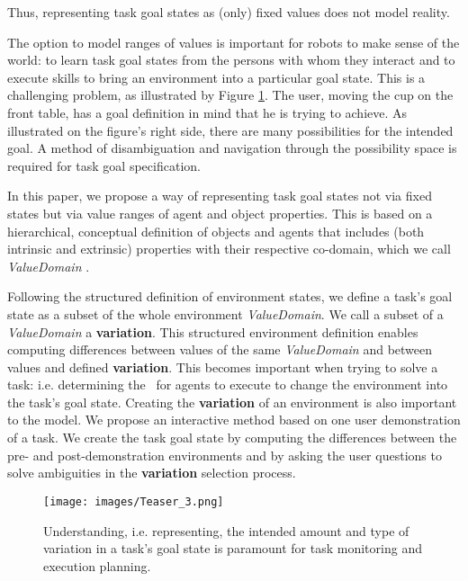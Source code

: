 Thus, representing task goal states as (only) fixed values does not model reality. 

The option to model ranges of values is important for robots to make sense of the world: to learn task goal states from the persons with whom they interact and to execute skills to bring an environment into a particular goal state. This is a challenging problem, as illustrated by Figure \ref{fig:teaser}. The user, moving the cup on the front table, has a goal definition in mind that he is trying to achieve. As illustrated on the figure's right side, there are many possibilities for the intended goal. A method of disambiguation and navigation through the possibility space is required for task goal specification.

In this paper, we propose a way of representing task goal states not via fixed states but via value ranges of agent and object properties. This is based on a hierarchical, conceptual definition of objects and agents that includes (both intrinsic and extrinsic) properties with their respective co-domain, which we call \textit{ValueDomain} \cite{conceptHierarchyGeriatronicsSummit24}.

Following the structured definition of environment states, we define a task’s goal state as a subset of the whole environment \textit{ValueDomain}. We call a subset of a \textit{ValueDomain} a \textbf{variation}. This structured environment definition enables computing differences between values of the same \textit{ValueDomain} and between values and defined \textbf{variation}. This becomes important when trying to solve a task: i.e. determining the \skills\ for agents to execute to change the environment into the task’s goal state. Creating the \textbf{variation} of an environment is also important to the model. We propose an interactive method based on one user demonstration of a task. We create the task goal state by computing the differences between the pre- and post-demonstration environments and by asking the user questions to solve ambiguities in the \textbf{variation} selection process.

\begin{figure}[t!]
    \centering
    \texttt{[image: images/Teaser\_3.png]}
    \caption{Understanding, i.e. representing, the intended amount and type of variation in a task's goal state is paramount for task monitoring and execution planning.} \label{fig:teaser}
\end{figure}

